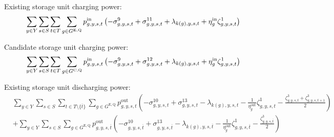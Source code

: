 \documentclass{article}
\newcommand{\sStorageExisting}{G^{\mathrm{E,Q}}}
\newcommand{\sStorageCandidate}{G^{\mathrm{C,Q}}}
\newcommand{\sYears}{Y}
\newcommand{\sScenarios}{S}
\newcommand{\sIntervals}{T}
\newcommand{\iGenerator}{g}
\newcommand{\iYear}{y}
\newcommand{\iScenario}{s}
\newcommand{\iInterval}{t}
\newcommand{\iIntervalTerminal}{\overline{\iInterval}}
\newcommand{\iZone}{z}
\newcommand{\cStorageUnitEfficiencyCharging}{\eta_{\iGenerator}^{\mathrm{in}}}
\newcommand{\cStorageUnitEfficiencyDischarging}{\eta_{\iGenerator}^{\mathrm{out}}}
\newcommand{\vPowerIn}[1][\iGenerator,\iYear,\iScenario,\iInterval]{p^{\mathrm{in}}_{#1}}
\newcommand{\vPowerOut}[1][\iGenerator,\iYear,\iScenario,\iInterval]{p^{\mathrm{out}}_{#1}}
\newcommand{\dNonNegativeCharging}[1][\iGenerator,\iYear,\iScenario,\iInterval]{\sigma_{#1}^{9}}
\newcommand{\dNonNegativeDischarging}[1][\iGenerator,\iYear,\iScenario,\iInterval]{\sigma_{#1}^{10}}
\newcommand{\dMaxChargingRateExisting}[1][\iGenerator,\iYear,\iScenario,\iInterval]{\sigma_{#1}^{11}}
\newcommand{\dMaxChargingRateCandidate}[1][\iGenerator,\iYear,\iScenario,\iInterval]{\sigma_{#1}^{12}}
\newcommand{\dMaxDischargingRateExisting}[1][\iGenerator,\iYear,\iScenario,\iInterval]{\sigma_{#1}^{13}}
\newcommand{\dPowerBalance}[1][\iZone,\iYear,\iScenario,\iInterval]{\lambda_{#1}}
\newcommand{\dStorageEnergyTransition}[1][\iGenerator,\iYear,\iScenario,\iInterval]{\zeta_{#1}^{1}}
\newcommand{\dStorageEnergyOutput}[1][\iGenerator,\iYear,\iScenario,\iInterval]{\zeta_{#1}^{3}}
\begin{document}
Existing storage unit charging power:
\begin{equation}
	\sumIntervals \sum\limits_{\iGenerator \in \sStorageExisting} \vPowerIn \left( - \dNonNegativeCharging + \dMaxChargingRateExisting + \dPowerBalance[k(\iGenerator),\iYear,\iScenario,\iInterval] + \cStorageUnitEfficiencyCharging\dStorageEnergyTransition\right)
\end{equation}

Candidate storage unit charging power:
\begin{equation}
	\sumIntervals \sum\limits_{\iGenerator \in \sStorageCandidate} \vPowerIn \left( - \dNonNegativeCharging + \dMaxChargingRateCandidate + \dPowerBalance[k(\iGenerator),\iYear,\iScenario,\iInterval] + \cStorageUnitEfficiencyCharging\dStorageEnergyTransition\right)
\end{equation}

Existing storage unit discharging power:
\begin{align}
	& \sum\limits_{\iYear \in \sYears}\sum\limits_{\iScenario \in \sScenarios}\sum\limits_{\iInterval \in \sIntervals \setminus \{\iIntervalTerminal\}} \sum\limits_{\iGenerator \in \sStorageExisting} \vPowerOut \left( - \dNonNegativeDischarging + \dMaxDischargingRateExisting - \dPowerBalance[k(\iGenerator),\iYear,\iScenario,\iInterval] - \frac{1}{\cStorageUnitEfficiencyDischarging} \dStorageEnergyTransition - \frac{\dStorageEnergyOutput + \dStorageEnergyOutput[\iGenerator,\iYear,\iScenario,\iInterval+1]}{2}\right) \nonumber\\
	& + \sum\limits_{\iYear \in \sYears}\sum\limits_{\iScenario \in \sScenarios} \sum\limits_{\iGenerator \in \sStorageExisting} \vPowerOut[\iGenerator,\iYear,\iScenario,\iIntervalTerminal] \left( - \dNonNegativeDischarging[\iGenerator,\iYear,\iScenario,\iIntervalTerminal] + \dMaxDischargingRateExisting[\iGenerator,\iYear,\iScenario,\iIntervalTerminal] - \dPowerBalance[k(\iGenerator),\iYear,\iScenario,\iIntervalTerminal] - \frac{1}{\cStorageUnitEfficiencyDischarging} \dStorageEnergyTransition[\iGenerator,\iYear,\iScenario,\iIntervalTerminal] - \frac{\dStorageEnergyOutput[\iGenerator,\iYear,\iScenario,\iIntervalTerminal]}{2}\right)\\\nonumber
\end{align}
\end{document}
